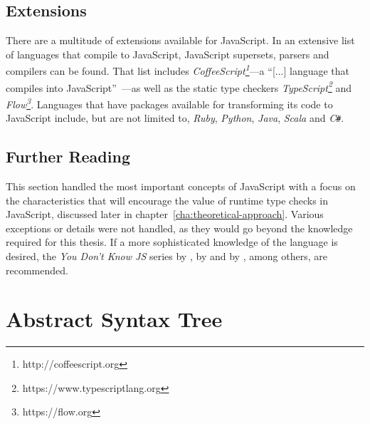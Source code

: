 

\subsection{Extensions}
\label{sec:javascript-extensions}

There are a multitude of extensions available for JavaScript. In \cite{LanguagesThatCompileToJS:CoffeeScript:2017} an extensive list of languages that compile to JavaScript, JavaScript supersets, parsers and compilers can be found. That list includes \emph{CoffeeScript\footnote{http://coffeescript.org}}---a ``[...] language that compiles into JavaScript''~\cite{CoffeeScript}---as well as the static type checkers \emph{TypeScript\footnote{https://www.typescriptlang.org}} and \emph{Flow\footnote{https://flow.org}}. Languages that have packages available for transforming its code to JavaScript include, but are not limited to, \emph{Ruby}, \emph{Python}, \emph{Java}, \emph{Scala} and \emph{C\texttt{\#}}.

\subsection{Further Reading}
\label{sec:further reading}


This section handled the most important concepts of JavaScript with a focus on the characteristics that will encourage the value of runtime type checks in JavaScript, discussed later in chapter~\ref{cha:theoretical-approach}. Various exceptions or details were not handled, as they would go beyond the knowledge required for this thesis. If a more sophisticated knowledge of the language is desired, the \emph{You Don't Know JS} series by \citeauthor{YDKJS:UpAndGoing:Simpson:2015}, \emph{\emph{}} by \citeauthor{JavaScriptTheGoodParts:Crockford:2008} and \emph{\emph{}} by \citeauthor{JavaScriptTheDefinitiveGuide:Flanagan:2011}, among others, are recommended.

\section{Abstract Syntax Tree}
\label{sec:ast}

